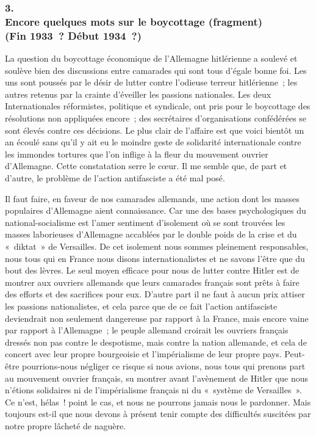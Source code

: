 \documentclass[french,twoside]{book} %
\begin{document}
\subsubsection[{3. Encore quelques mots sur le boycottage (fragment) (Fin 1933 ? Début 1934 ?)}]{3. \\
Encore quelques mots sur le boycottage (fragment) \\
(Fin 1933 ? Début 1934 ?)}
\noindent \par
La question du boycottage économique de l'Allemagne hitlérienne a soulevé et soulève bien des discussions entre camarades qui sont tous d'égale bonne foi. Les uns sont poussés par le désir de lutter contre l'odieuse terreur hitlérienne ; les autres retenus par la crainte d'éveiller les passions nationales. Les deux Internationales réformistes, politique et syndicale, ont pris pour le boycottage des résolutions non appliquées encore ; des secrétaires d'organisa­tions confédérées se sont élevés contre ces décisions. Le plus clair de l'affaire est que voici bientôt un an écoulé sans qu'il y ait eu le moindre geste de solidarité internationale contre les immondes tortures que l'on inflige à la fleur du mouvement ouvrier d'Allemagne. Cette constatation serre le cœur. Il me semble que, de part et d'autre, le problème de l'action antifasciste a été mal posé.\par
Il faut faire, en faveur de nos camarades allemands, une action dont les masses populaires d'Allemagne aient connaissance. Car une des bases psycho­logiques du national-socialisme est l'amer sentiment d'isolement où se sont trouvées les masses laborieuses d'Allemagne accablées par le double poids de la crise et du « diktat » de Versailles. De cet isolement nous sommes pleine­ment responsables, nous tous qui en France nous disons internationa­listes et ne savons l'être que du bout des lèvres. Le seul moyen efficace pour nous de lutter contre Hitler est de montrer aux ouvriers allemands que leurs camarades français sont prêts à faire des efforts et des sacrifices pour eux. D'autre part il ne faut à aucun prix attiser les passions nationalistes, et cela parce que de ce fait l'action antifasciste deviendrait non seulement dangereuse par rapport à la France, mais encore vaine par rapport à l'Allemagne ; le peuple allemand croirait les ouvriers français dressés non pas contre le despotisme, mais contre la nation allemande, et cela de concert avec leur propre bourgeoisie et l'impé­rialisme de leur propre pays. Peut-être pourrions-nous négliger ce risque si nous avions, nous tous qui prenons part au mouvement ouvrier français, su montrer avant l'avènement de Hitler que nous n'étions solidaires ni de l'impérialisme français ni du « système de Versailles ». Ce n'est, hélas ! point le cas, et nous ne pourrons jamais nous le pardonner. Mais toujours est-il que nous devons à présent tenir compte des difficultés suscitées par notre propre lâcheté de naguère.\par
\end{document}

